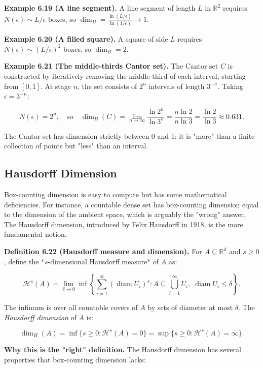 \textbf{Example 6.19 (A line segment).} A line segment of length $L$ in $\mathbb{R}^2$ requires $N(\epsilon) \sim L/\epsilon$ boxes, so $\dim_B = \frac{\ln(L/\epsilon)}{\ln(1/\epsilon)} \to 1$.

\textbf{Example 6.20 (A filled square).} A square of side $L$ requires $N(\epsilon) \sim (L/\epsilon)^2$ boxes, so $\dim_B = 2$.

\textbf{Example 6.21 (The middle-thirds Cantor set).} The Cantor set $C$ is constructed by iteratively removing the middle third of each interval, starting from $[0,1]$. At stage $n$, the set consists of $2^n$ intervals of length $3^{-n}$. Taking $\epsilon = 3^{-n}$:

\[
N(\epsilon) = 2^n, \quad \text{so} \quad \dim_B(C) = \lim_{n \to \infty} \frac{\ln 2^n}{\ln 3^n} = \frac{n \ln 2}{n \ln 3} = \frac{\ln 2}{\ln 3} \approx 0.631.
\]

The Cantor set has dimension strictly between 0 and 1: it is "more" than a finite collection of points but "less" than an interval.

\subsection{Hausdorff Dimension}\label{sec:6.5.2}

Box-counting dimension is easy to compute but has some mathematical deficiencies. For instance, a countable dense set has box-counting dimension equal to the dimension of the ambient space, which is arguably the "wrong" answer. The Hausdorff dimension, introduced by Felix Hausdorff in 1918, is the more fundamental notion.

\textbf{Definition 6.22 (Hausdorff measure and dimension).} For $A \subseteq \mathbb{R}^d$ and $s \geq 0$, define the *$s$-dimensional Hausdorff measure* of $A$ as:

\[
\mathcal{H}^s(A) = \lim_{\delta \to 0} \inf \left\{ \sum_{i=1}^{\infty} (\operatorname{diam} U_i)^s : A \subseteq \bigcup_{i=1}^{\infty} U_i, \; \operatorname{diam} U_i \leq \delta \right\}.
\]

The infimum is over all countable covers of $A$ by sets of diameter at most $\delta$. The \textit{Hausdorff dimension} of $A$ is:

\[
\dim_H(A) = \inf\{s \geq 0 : \mathcal{H}^s(A) = 0\} = \sup\{s \geq 0 : \mathcal{H}^s(A) = \infty\}.
\]

\textbf{Why this is the "right" definition.} The Hausdorff dimension has several properties that box-counting dimension lacks:

